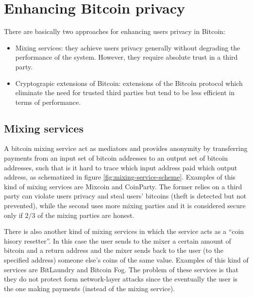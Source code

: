 
\section{Enhancing Bitcoin privacy}
There are basically two approaches for enhancing users privacy in Bitcoin:
\begin{itemize}
  \item Mixing services: they achieve users privacy generally without degrading
  the performance of the system. However, they require absolute trust in a third
  party.
  \item Cryptograpic extensions of Bitcoin: extensions of the Bitcoin protocol
  which eliminate the need for trusted third parties but tend to be less efficient
  in terms of performance.
\end{itemize}


\subsection{Mixing services} A bitcoin mixing service act as mediators and
provides anonymity by transferring payments from an input set of bitcoin
addresses to an output set of bitcoin addresses, such that is it hard to trace
which input address paid which output address, as schematized in figure
\ref{fig:mixing-service-scheme}. Examples of this kind of mixing services are
Mixcoin and CoinParty. The former relies on a third party can violate users
privacy and steal users’ bitcoins (theft is detected but not prevented), while
the second uses more mixing parties and it is considered secure only if $2/3$ of
the mixing parties are honest.

There is also another kind of mixing services in which the service acts as a
``coin hisory resetter''. In this case the user sends to the mixer a certain
amount of bitcoin and a return address and the mixer sends back to the user (to
the specified address) someone else’s coins of the same value. Examples of this
kind of services are BitLaundry and Bitcoin Fog. The problem of these services is
that they do not protect form network-layer attacks since the eventually the
user is the one making payments (instead of the mixing service).

